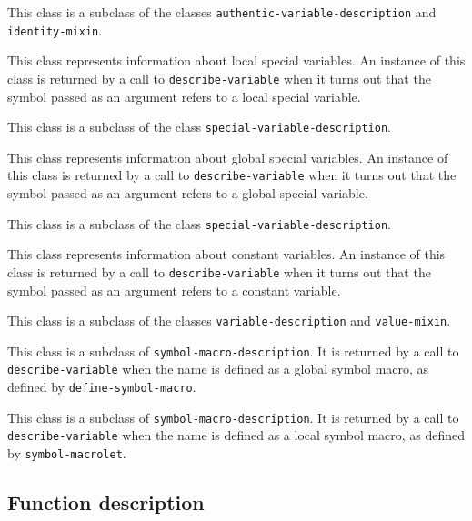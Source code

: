 This class is a subclass of the classes
\texttt{authentic-variable-description} and \texttt{identity-mixin}.

{\footnotesize
{}
}

This class represents information about local special variables.   An
instance of this class is returned by a call to \texttt{describe-variable}
when it turns out that the symbol passed as an argument refers to a
local special variable.

This class is a subclass of the class
\texttt{special-variable-description}.

{\footnotesize
{}
}

This class represents information about global special variables.   An
instance of this class is returned by a call to \texttt{describe-variable}
when it turns out that the symbol passed as an argument refers to a
global special variable.

This class is a subclass of the class
\texttt{special-variable-description}.

{\footnotesize
{}
}

This class represents information about constant variables.   An
instance of this class is returned by a call to \texttt{describe-variable}
when it turns out that the symbol passed as an argument refers to a
constant variable.

This class is a subclass of the classes \texttt{variable-description} and
\texttt{value-mixin}.

{\footnotesize
{}
}

This class is a subclass of \texttt{symbol-macro-description}.  It is
returned by a call to \texttt{describe-variable} when the name is
defined as a global symbol macro, as defined by
\texttt{define-symbol-macro}.

{\footnotesize
{}
}

This class is a subclass of \texttt{symbol-macro-description}.  It is
returned by a call to \texttt{describe-variable} when the
name is defined as a local symbol macro, as defined by
\texttt{symbol-macrolet}.

\subsection{Function description}
\label{sec-instantiable-classes-function-description}


